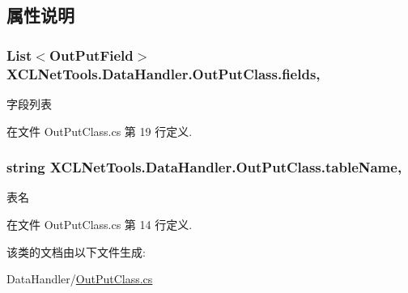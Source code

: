 \subsection{属性说明}
\hypertarget{class_x_c_l_net_tools_1_1_data_handler_1_1_out_put_class_aaa38718d249736e2070ab87f10a829ae}{
\subsubsection[{fields}]{\setlength{\rightskip}{0pt plus 5cm}List$<${\bf Out\-Put\-Field}$>$ X\-C\-L\-Net\-Tools.\-Data\-Handler.\-Out\-Put\-Class.\-fields\hspace{0.3cm}{\ttfamily [get]}, {\ttfamily [set]}}}\label{class_x_c_l_net_tools_1_1_data_handler_1_1_out_put_class_aaa38718d249736e2070ab87f10a829ae}


字段列表 



在文件 Out\-Put\-Class.\-cs 第 19 行定义.

\hypertarget{class_x_c_l_net_tools_1_1_data_handler_1_1_out_put_class_aef1df865588230b66b506058970e8894}{
\subsubsection[{table\-Name}]{\setlength{\rightskip}{0pt plus 5cm}string X\-C\-L\-Net\-Tools.\-Data\-Handler.\-Out\-Put\-Class.\-table\-Name\hspace{0.3cm}{\ttfamily [get]}, {\ttfamily [set]}}}\label{class_x_c_l_net_tools_1_1_data_handler_1_1_out_put_class_aef1df865588230b66b506058970e8894}


表名 



在文件 Out\-Put\-Class.\-cs 第 14 行定义.



该类的文档由以下文件生成\-:\begin{DoxyCompactItemize}
\item 
Data\-Handler/\hyperlink{_out_put_class_8cs}{Out\-Put\-Class.\-cs}\end{DoxyCompactItemize}
